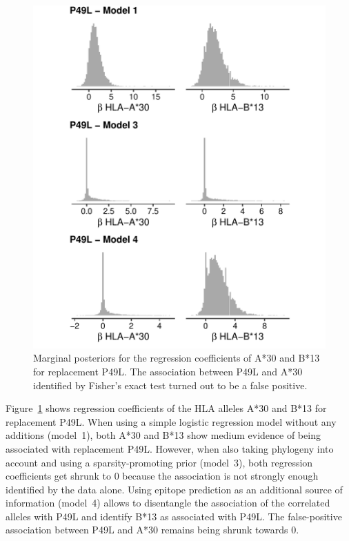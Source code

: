 \documentclass{bioinfo}
\begin{document}
\begin{figure}
  \includegraphics[width=1.1\linewidth]{plots/P49L_combined.pdf}
  \caption{Marginal posteriors for the regression coefficients of A*30 and B*13 for replacement P49L. The association between P49L and A*30 identified by Fisher's exact test turned out to be a false positive.}
  \label{fig:linkage}
\end{figure}

Figure~\ref{fig:linkage} shows regression coefficients of the HLA alleles A*30 and B*13 for replacement P49L. When using a simple logistic regression model without any additions (model~1), both A*30 and B*13 show medium evidence of being associated with replacement P49L. However, when also taking phylogeny into account and using a sparsity-promoting prior (model~3), both regression coefficients get shrunk to 0 because the association is not strongly enough identified by the data alone.
Using epitope prediction as an additional source of information (model~4) allows to disentangle the association of the correlated alleles with P49L and identify B*13 as associated with P49L. The false-positive association between P49L and A*30 remains being shrunk towards 0.  
\end{document}
